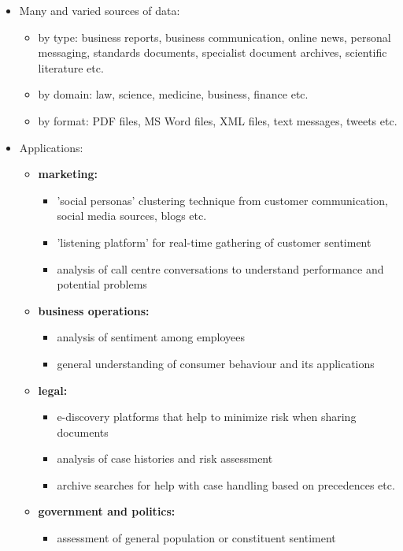\begin{itemize}
\item Many and varied sources of data:
  \begin{itemize}
  \item by type: business reports, business communication, online news, personal messaging, standards documents, specialist document archives, scientific literature etc.
  \item by domain: law, science, medicine, business, finance etc.
    \item by format: PDF files, MS Word files, XML files, text messages, tweets etc.
  \end{itemize}
\item Applications:
  \begin{itemize}
  \item \textbf{marketing:}
    \begin{itemize}
      \item 'social personas' clustering technique from customer communication, social media sources, blogs etc.
      \item 'listening platform' for real-time gathering of customer sentiment
      \item analysis of call centre conversations to understand performance and potential problems
    \end{itemize}
  \item \textbf{business operations:}
    \begin{itemize}
    \item analysis of sentiment among employees
    \item general understanding of consumer behaviour and its applications
    \end{itemize}
  \item \textbf{legal:}
    \begin{itemize}
    \item e-discovery platforms that help to minimize risk when sharing documents
    \item analysis of case histories and risk assessment
    \item archive searches for help with case handling based on precedences etc.
    \end{itemize}
  \item \textbf{government and politics:}
    \begin{itemize}
    \item assessment of general population or constituent sentiment 

\end{itemize}
\end{itemize}
\end{itemize}
